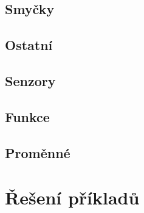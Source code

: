 \subsection{Smyčky }
\begin{itemize}
	\blockLoop
	\blockLoopForever
	\blockLoopWhile
\end{itemize}

\subsection{Ostatní }
\begin{itemize}
	\blockStart
	\blockMotorDone
	\blockWait
	\blockWaitUntil
\end{itemize}

\subsection{Senzory }
\begin{itemize}
	\blockBumperPressed
\end{itemize}

\subsection{Funkce }
\begin{itemize}
	\blockFunctionDefinition
	\blockFunctionCall
\end{itemize}

\subsection{Proměnné }
\begin{itemize}
	\blockVariableCreate
	\blockVariableChange
	\blockVariableGet
	\blockVariableSet
\end{itemize}

\newpage

\section{Řešení příkladů}\label{cha:sol}

\printsolutions

\newpage

\nocite{*}
\printbibliography[title={Zdroje}]

